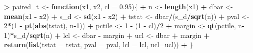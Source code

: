 \documentclass[]{krantz}
\makeatletter
\newenvironment{Shaded}{\begin{snugshade}}{\end{snugshade}}
\newcommand{\KeywordTok}[1]{\textcolor[rgb]{0.27,0.27,0.27}{\textbf{#1}}}
\newcommand{\DataTypeTok}[1]{\textcolor[rgb]{0.27,0.27,0.27}{#1}}
\newcommand{\DecValTok}[1]{\textcolor[rgb]{0.06,0.06,0.06}{#1}}
\newcommand{\FloatTok}[1]{\textcolor[rgb]{0.06,0.06,0.06}{#1}}
\newcommand{\StringTok}[1]{\textcolor[rgb]{0.5,0.5,0.5}{#1}}
\newcommand{\ControlFlowTok}[1]{\textcolor[rgb]{0.27,0.27,0.27}{\textbf{#1}}}
\newcommand{\OperatorTok}[1]{\textcolor[rgb]{0.43,0.43,0.43}{\textbf{#1}}}
\newcommand{\NormalTok}[1]{#1}
\newenvironment{kframe}{%
\medskip{}
\setlength{\fboxsep}{.8em}
 \def\at@end@of@kframe{}%
 \ifinner\ifhmode%
  \def\at@end@of@kframe{\end{minipage}}%
  \begin{minipage}{\columnwidth}%
 \fi\fi%
 \def\FrameCommand##1{\hskip\@totalleftmargin \hskip-\fboxsep
 \colorbox{shadecolor}{##1}\hskip-\fboxsep
     \hskip-\linewidth \hskip-\@totalleftmargin \hskip\columnwidth}%
 \MakeFramed {\advance\hsize-\width
   \@totalleftmargin\z@ \linewidth\hsize
   \@setminipage}}%
 {\par\unskip\endMakeFramed%
 \at@end@of@kframe}
\renewenvironment{Shaded}{\begin{kframe}}{\end{kframe}}
\makeatother
\begin{document}
\begin{Shaded}
\begin{Highlighting}[]
\OperatorTok{>}\StringTok{ }\NormalTok{paired_t <-}\StringTok{ }\ControlFlowTok{function}\NormalTok{(x1, x2, }\DataTypeTok{cl =} \FloatTok{0.95}\NormalTok{)\{}
\OperatorTok{+}\StringTok{     }\NormalTok{n <-}\StringTok{ }\KeywordTok{length}\NormalTok{(x1)}
\OperatorTok{+}\StringTok{     }\NormalTok{dbar <-}\StringTok{ }\KeywordTok{mean}\NormalTok{(x1 }\OperatorTok{-}\StringTok{ }\NormalTok{x2)}
\OperatorTok{+}\StringTok{     }\NormalTok{s_d <-}\StringTok{ }\KeywordTok{sd}\NormalTok{(x1 }\OperatorTok{-}\StringTok{ }\NormalTok{x2)}
\OperatorTok{+}\StringTok{     }\NormalTok{tstat <-}\StringTok{ }\NormalTok{dbar}\OperatorTok{/}\NormalTok{(s_d}\OperatorTok{/}\KeywordTok{sqrt}\NormalTok{(n))}
\OperatorTok{+}\StringTok{     }\NormalTok{pval <-}\StringTok{ }\DecValTok{2}\OperatorTok{*}\NormalTok{(}\DecValTok{1} \OperatorTok{-}\StringTok{ }\KeywordTok{pt}\NormalTok{(}\KeywordTok{abs}\NormalTok{(tstat), n}\OperatorTok{-}\DecValTok{1}\NormalTok{))}
\OperatorTok{+}\StringTok{     }\NormalTok{pctile <-}\StringTok{ }\DecValTok{1} \OperatorTok{-}\StringTok{ }\NormalTok{(}\DecValTok{1} \OperatorTok{-}\StringTok{ }\NormalTok{cl)}\OperatorTok{/}\DecValTok{2}
\OperatorTok{+}\StringTok{     }\NormalTok{margin <-}\StringTok{ }\KeywordTok{qt}\NormalTok{(pctile, n}\OperatorTok{-}\DecValTok{1}\NormalTok{)}\OperatorTok{*}\NormalTok{s_d}\OperatorTok{/}\KeywordTok{sqrt}\NormalTok{(n)}
\OperatorTok{+}\StringTok{     }\NormalTok{lcl <-}\StringTok{ }\NormalTok{dbar }\OperatorTok{-}\StringTok{ }\NormalTok{margin}
\OperatorTok{+}\StringTok{     }\NormalTok{ucl <-}\StringTok{ }\NormalTok{dbar }\OperatorTok{+}\StringTok{ }\NormalTok{margin}
\OperatorTok{+}\StringTok{     }\KeywordTok{return}\NormalTok{(}\KeywordTok{list}\NormalTok{(}\DataTypeTok{tstat =}\NormalTok{ tstat, }\DataTypeTok{pval =}\NormalTok{ pval, }\DataTypeTok{lcl =}\NormalTok{ lcl, }\DataTypeTok{ucl=}\NormalTok{ucl))}
\OperatorTok{+}\StringTok{ }\NormalTok{\}}
\end{Highlighting}
\end{Shaded}

\begin{Shaded}
\end{Shaded}
\end{document}
